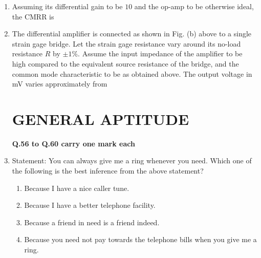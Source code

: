 \documentclass[journal,12pt,onecolumn]{IEEEtran}
\theoremstyle{remark}
\begin{document}
\begin{enumerate}
\item Assuming its differential gain to be $10$ and the op-amp to be otherwise ideal, the CMRR is  
\par \hfill{}
\begin{enumerate}
\end{enumerate}

\item The differential amplifier is connected as shown in Fig. (b) above to a single strain gage bridge. Let the strain gage resistance vary around its no-load resistance $R$ by $\pm 1\%$. Assume the input impedance of the amplifier to be high compared to the equivalent source resistance of the bridge, and the common mode characteristic to be as obtained above. The output voltage in mV varies approximately from  
\par \hfill{}
\begin{enumerate}
\end{enumerate}

\section*{GENERAL APTITUDE}

\textbf{Q.56 to Q.60 carry one mark each}

\item Statement: You can always give me a ring whenever you need. Which one of the following is the best inference from the above statement?  
\par \hfill{}
\begin{enumerate}
\item Because I have a nice caller tune.
\item Because I have a better telephone facility.
\item Because a friend in need is a friend indeed.
\item Because you need not pay towards the telephone bills when you give me a ring.
\end{enumerate}


\end{enumerate}
\end{document}

